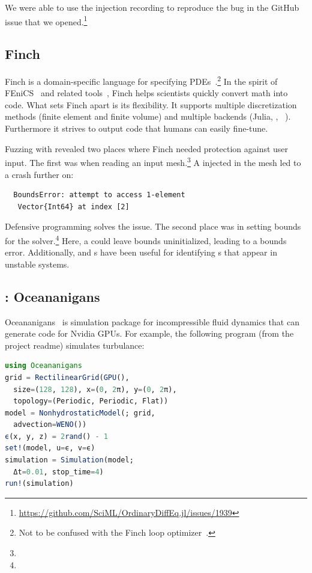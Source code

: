 \documentclass{juliacon}
\begin{document}
We were able to use the injection recording to reproduce the bug in the GitHub issue that we opened.\footnote{\url{https://github.com/SciML/OrdinaryDiffEq.jl/issues/1939}}

\subsection{Finch}
\label{s:finch}

Finch is a domain-specific language for specifying
PDEs~\cite{heislerFinchDomainSpecific2022}.\footnote{Not to be confused
with the Finch loop optimizer~\cite{adka-cgo-2023}.}
In the spirit of FEniCS~\cite{fenics} and related
tools~\cite{freefem,openfoam,dune,firedrake},
Finch helps scientists quickly convert math into code.
What sets Finch apart is its flexibility.
It supports multiple discretization methods (finite element and finite
volume) and multiple backends (Julia, \CPP{}, \Dendro{}~\cite{dendro}).
Furthermore it strives to output code that humans can easily fine-tune.

Fuzzing with \FT{} revealed two places where Finch needed
protection against user input.
The first was when reading an input mesh.\footnote{}
A \NaN{} injected in the mesh led to a crash further on:
\begin{verbatim}
  BoundsError: attempt to access 1-element
   Vector{Int64} at index [2]
\end{verbatim}
Defensive programming solves the issue.
The second place was in setting bounds for the
solver.\footnote{}
Here, a \NaN{} could leave bounds uninitialized, leading to a bounds error.
Additionally, \FT{} and \CSTG{}s have been useful for identifying \NaN{}s that
appear in unstable systems.

\subsection{\GPUFPX{}: Oceananigans}
\label{s:ocean}

Oceananigans~\cite{OceananigansJOSS} is simulation package for incompressible
fluid dynamics that can generate code for Nvidia GPUs.
For example, the following program (from the project readme) simulates turbulance:

\begin{lstlisting}[language = Julia]
using Oceananigans
grid = RectilinearGrid(GPU(),
  size=(128, 128), x=(0, 2π), y=(0, 2π),
  topology=(Periodic, Periodic, Flat))
model = NonhydrostaticModel(; grid,
  advection=WENO())
ϵ(x, y, z) = 2rand() - 1
set!(model, u=ϵ, v=ϵ)
simulation = Simulation(model;
  Δt=0.01, stop_time=4)
run!(simulation)
\end{lstlisting}
\end{document}
